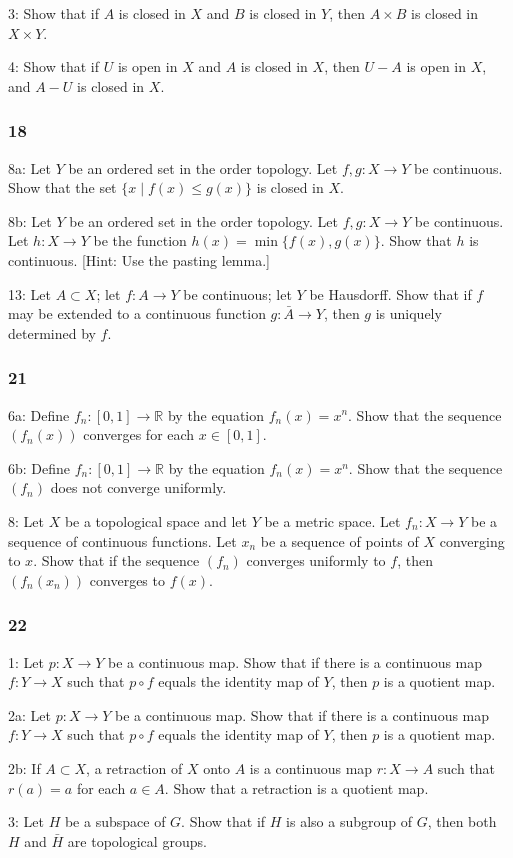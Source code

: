 \documentclass{article}
\begin{document}
3: Show that if $A$ is closed in $X$ and $B$ is closed in $Y$, then $A \times B$ is closed in $X \times Y$.

4: Show that if $U$ is open in $X$ and $A$ is closed in $X$, then $U-A$ is open in $X$, and $A-U$ is closed in $X$.

\subsubsection*{18}
8a: Let $Y$ be an ordered set in the order topology. Let $f, g: X \rightarrow Y$ be continuous. Show that the set $\{x \mid f(x) \leq g(x)\}$ is closed in $X$.

8b: Let $Y$ be an ordered set in the order topology. Let $f, g: X \rightarrow Y$ be continuous. Let $h: X \rightarrow Y$ be the function $h(x)=\min \{f(x), g(x)\}.$ Show that $h$ is continuous. [Hint: Use the pasting lemma.] 

13: Let $A \subset X$; let $f: A \rightarrow Y$ be continuous; let $Y$ be Hausdorff. Show that if $f$ may be extended to a continuous function $g: \bar{A} \rightarrow Y$, then $g$ is uniquely determined by $f$.

\subsubsection*{21}

6a: Define $f_{n}:[0,1] \rightarrow \mathbb{R}$ by the equation $f_{n}(x)=x^{n}$. Show that the sequence $\left(f_{n}(x)\right)$ converges for each $x \in[0,1]$. 

6b: Define $f_{n}:[0,1] \rightarrow \mathbb{R}$ by the equation $f_{n}(x)=x^{n}$. Show that the sequence $\left(f_{n}\right)$ does not converge uniformly.

8: Let $X$ be a topological space and let $Y$ be a metric space. Let $f_{n}: X \rightarrow Y$ be a sequence of continuous functions. Let $x_{n}$ be a sequence of points of $X$ converging to $x$. Show that if the sequence $\left(f_{n}\right)$ converges uniformly to $f$, then $\left(f_{n}\left(x_{n}\right)\right)$ converges to $f(x)$.

\subsubsection*{22}
1: Let $p: X \rightarrow Y$ be a continuous map. Show that if there is a continuous map $f: Y \rightarrow X$ such that $p \circ f$ equals the identity map of $Y$, then $p$ is a quotient map.

2a: Let $p: X \rightarrow Y$ be a continuous map. Show that if there is a continuous map $f: Y \rightarrow X$ such that $p \circ f$ equals the identity map of $Y$, then $p$ is a quotient map.

2b: If $A \subset X$, a retraction of $X$ onto $A$ is a continuous map $r: X \rightarrow A$ such that $r(a)=a$ for each $a \in A$. Show that a retraction is a quotient map.

3: Let $H$ be a subspace of $G$. Show that if $H$ is also a subgroup of $G$, then both $H$ and $\bar{H}$ are topological groups.
\end{document}
